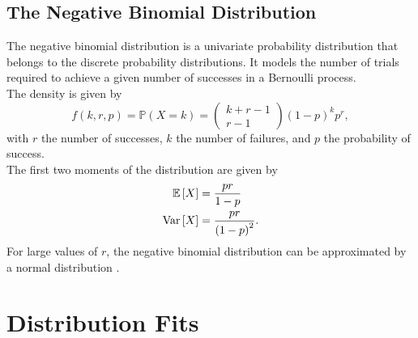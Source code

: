 \subsection{The Negative Binomial Distribution}
The negative binomial distribution is a univariate probability distribution that belongs to the discrete probability distributions. It models the number of trials required to achieve a given number of successes in a Bernoulli process. \\
The density is given by
\begin{equation}
    f\left(k,r,p\right)=\mathbb{P}\left(X=k\right)=\begin{pmatrix} k+r-1\\r-1\end{pmatrix}\left(1-p\right)^kp^r,
\end{equation}
with $r$ the number of successes, $k$ the number of failures, and $p$ the probability of success. \\
The first two moments of the distribution are given by
\begin{align}
    \mathbb{E}\left[X\right] &= \frac{pr}{1-p} \\
    \hbox{Var}\left[X\right] &= \frac{pr}{\left(1-p\right)^2}.
\end{align} 
For large values of $r$, the negative binomial distribution can be approximated by a normal distribution
\cite{haldane1941fitting}.
\clearpage
\section{Distribution Fits}

